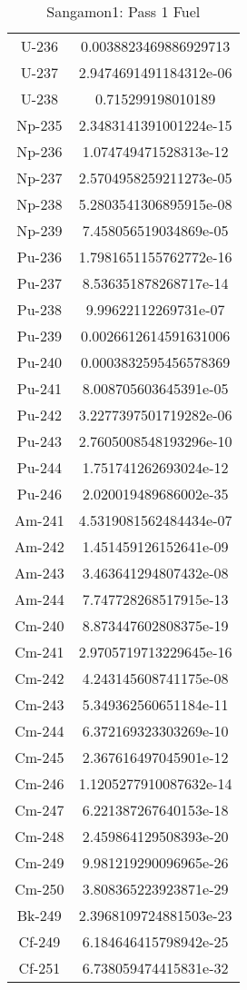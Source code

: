\begin{table}[h!]
\begin{tabular}{|| c || c |}
U-236 &  0.0038823469886929713 \\
U-237 &  2.9474691491184312e-06 \\
U-238 &  0.715299198010189 \\
Np-235 &  2.3483141391001224e-15 \\
Np-236 &  1.074749471528313e-12 \\
Np-237 &  2.5704958259211273e-05 \\
Np-238 &  5.2803541306895915e-08 \\
Np-239 &  7.458056519034869e-05 \\
Pu-236 &  1.7981651155762772e-16 \\
Pu-237 &  8.536351878268717e-14 \\
Pu-238 &  9.99622112269731e-07 \\
Pu-239 &  0.0026612614591631006 \\
Pu-240 &  0.0003832595456578369 \\
Pu-241 &  8.008705603645391e-05 \\
Pu-242 &  3.2277397501719282e-06 \\
Pu-243 &  2.7605008548193296e-10 \\
Pu-244 &  1.751741262693024e-12 \\
Pu-246 &  2.020019489686002e-35 \\
Am-241 &  4.5319081562484434e-07 \\
Am-242 &  1.451459126152641e-09 \\
Am-243 &  3.463641294807432e-08 \\
Am-244 &  7.747728268517915e-13 \\
Cm-240 &  8.873447602808375e-19 \\
Cm-241 &  2.9705719713229645e-16 \\
Cm-242 &  4.243145608741175e-08 \\
Cm-243 &  5.349362560651184e-11 \\
Cm-244 &  6.372169323303269e-10 \\
Cm-245 &  2.367616497045901e-12 \\
Cm-246 &  1.1205277910087632e-14 \\
Cm-247 &  6.221387267640153e-18 \\
Cm-248 &  2.459864129508393e-20 \\
Cm-249 &  9.981219290096965e-26 \\
Cm-250 &  3.808365223923871e-29 \\
Bk-249 &  2.3968109724881503e-23 \\
Cf-249 &  6.184646415798942e-25 \\
Cf-251 &  6.738059474415831e-32 \\

\hline
\end{tabular}
\caption{Sangamon1: Pass 1 Fuel}
\label{table:sang1p1fuel}
\end{table}